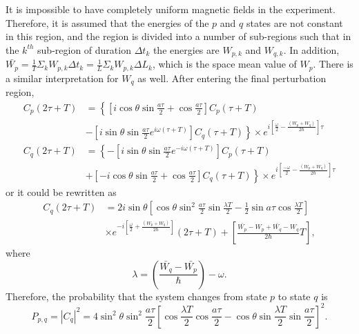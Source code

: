It is impossible to have completely uniform magnetic fields in the
experiment. Therefore, it is assumed that the energies of the $p$ and $q$
states are not constant in this region, and the region is divided into
a number of sub-regions such that in the $k^{th}$ sub-region of
duration $\Delta t_k$ the energies are $W_{p,k}$ and $W_{q,k}$.
In addition,
$\bar{W_p}=\frac{1}{T}\Sigma_k W_{p,k}\Delta t_k=\frac{1}{L}\Sigma_k
W_{p,k} \Delta L_k$, which is the space mean value of $W_p$. There is
a similar interpretation for $W_q$ as well. After entering the final
perturbation region,
\begin{align}
  C_p(2\tau+T) &=\left\lbrace \left[i \cos \theta \sin \frac{a\tau}{2}+\cos \frac{a\tau}{2}\right]C_p(\tau+T) \right. \\ \nonumber
                 &-
 \left. \left[i \sin \theta \sin \frac{a\tau}{2} e^{i \omega (\tau+T)}\right]C_q(\tau+T)\right\rbrace \times
  e^{i\left[\frac{\omega}{2}-\frac{(W_p+W_q)}{2\hbar}\right]\tau}\\ \nonumber
  C_q(2\tau+T) &=\left\lbrace -\left[i \sin \theta \sin \frac{a\tau}{2} e^{-i \omega (\tau+T)}\right]C_p(\tau+T) \right . \\ \nonumber
  &+ \left . \left[ -i \cos \theta \sin \frac{a\tau}{2}+ \cos \frac{a\tau}{2}\right] C_q(\tau+T)\right\rbrace \times
  e^{i \left[\frac{-\omega}{2}-\frac{(W_p+W_q)}{2\hbar}\right]\tau}
\end{align}
or it could be rewritten as
\begin{align}
  C_q(2\tau+T)&= 2i\sin \theta \left[ \cos \theta \sin^2 \frac{a\tau}{2}\sin \frac{\lambda T}{2} -\frac{1}{2}\sin a\tau \cos \frac{\lambda T}{2} \right] \nonumber \\ &\times e^{-i \left[\frac{\omega}{2} + \frac{(W_p+W_q)}{2\hbar}\right]}(2\tau+T) +
                                                                                                                                                                        \left[ \frac{\bar{W_p}-W_p+\bar{W_q}-W_q}{2\hbar} 
                                                                                                                                                                        T\right] ,
\end{align} 
where
\begin{equation}
\lambda= \left( \frac{\bar{W_q}-\bar{W_p}}{\hbar} \right)- \omega .
\end{equation}
Therefore, the probability that the system changes from state $p$ to
state $q$ is
%
\begin{equation}
P_{p,q}=|C_q|^2 =4 \sin ^2 \theta \sin ^2 \frac{a\tau}{2} \left[
\cos \frac{\lambda T}{2} \cos \frac{a\tau}{2} -
\cos \theta \sin \frac{\lambda T}{2} \sin \frac{a\tau}{2} \right] ^2 .
\end{equation}
